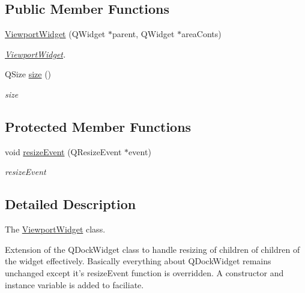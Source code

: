 \subsection*{Public Member Functions}
\begin{DoxyCompactItemize}
\item 
\hyperlink{class_viewport_widget_a0012361ba2ffd4983794291422db7e7a}{Viewport\-Widget} (Q\-Widget $\ast$parent, Q\-Widget $\ast$area\-Conts)
\begin{DoxyCompactList}\small\item\em \hyperlink{class_viewport_widget}{Viewport\-Widget}. \end{DoxyCompactList}\item 
Q\-Size \hyperlink{class_viewport_widget_a207a42f641caf95552b0352a458f8447}{size} ()
\begin{DoxyCompactList}\small\item\em size \end{DoxyCompactList}\end{DoxyCompactItemize}
\subsection*{Protected Member Functions}
\begin{DoxyCompactItemize}
\item 
void \hyperlink{class_viewport_widget_a319e0b4792e88f86ce11da6ae415930c}{resize\-Event} (Q\-Resize\-Event $\ast$event)
\begin{DoxyCompactList}\small\item\em resize\-Event \end{DoxyCompactList}\end{DoxyCompactItemize}


\subsection{Detailed Description}
The \hyperlink{class_viewport_widget}{Viewport\-Widget} class. 

Extension of the Q\-Dock\-Widget class to handle resizing of children of children of the widget effectively. Basically everything about Q\-Dock\-Widget remains unchanged except it's resize\-Event function is overridden. A constructor and instance variable is added to faciliate. 

